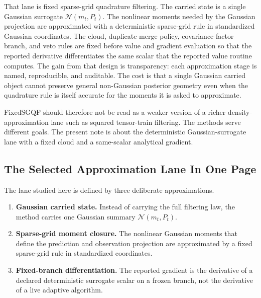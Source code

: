 \documentclass[11pt]{article}
\numberwithin{equation}{section}
\newcommand{\N}{\mathcal N}
\begin{document}
That lane is fixed sparse-grid quadrature filtering.  The carried state is a
single Gaussian surrogate \(\N(m_t,P_t)\).  The nonlinear moments needed by the
Gaussian projection are approximated with a deterministic sparse-grid rule in
standardized Gaussian coordinates.  The cloud, duplicate-merge policy,
covariance-factor branch, and veto rules are fixed before value and gradient
evaluation so that the reported derivative differentiates the same scalar that
the reported value routine computes.  The gain from that design is transparency:
each approximation stage is named, reproducible, and auditable.  The cost is
that a single Gaussian carried object cannot preserve general non-Gaussian
posterior geometry even when the quadrature rule is itself accurate for the
moments it is asked to approximate.

FixedSGQF should therefore not be read as a weaker version of a richer
density-approximation lane such as squared tensor-train filtering.  The methods
serve different goals.  The present note is about the deterministic
Gaussian-surrogate lane with a fixed cloud and a same-scalar analytical
gradient.

\subsection{The Selected Approximation Lane In One Page}
\label{sec:p32-one-page}

The lane studied here is defined by three deliberate approximations.
\begin{enumerate}[leftmargin=0.28in]
  \item \textbf{Gaussian carried state.}  Instead of carrying the full filtering
  law, the method carries one Gaussian summary \(\N(m_t,P_t)\).
  \item \textbf{Sparse-grid moment closure.}  The nonlinear Gaussian moments that
  define the prediction and observation projection are approximated by a fixed
  sparse-grid rule in standardized coordinates.
  \item \textbf{Fixed-branch differentiation.}  The reported gradient is the
  derivative of a declared deterministic surrogate scalar on a frozen branch, not
  the derivative of a live adaptive algorithm.
\end{enumerate}
\end{document}
